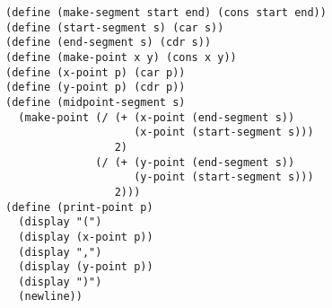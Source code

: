 \documentclass[a4paper,12pt]{article}
\begin{document}
\begin{lstlisting}
(define (make-segment start end) (cons start end))
(define (start-segment s) (car s))
(define (end-segment s) (cdr s))
(define (make-point x y) (cons x y))
(define (x-point p) (car p))
(define (y-point p) (cdr p))
(define (midpoint-segment s)
  (make-point (/ (+ (x-point (end-segment s))
                    (x-point (start-segment s)))
                 2)
              (/ (+ (y-point (end-segment s))
                    (y-point (start-segment s)))
                 2)))
(define (print-point p)
  (display "(")
  (display (x-point p))
  (display ",")
  (display (y-point p))
  (display ")")
  (newline))
\end{lstlisting}
\end{document}
